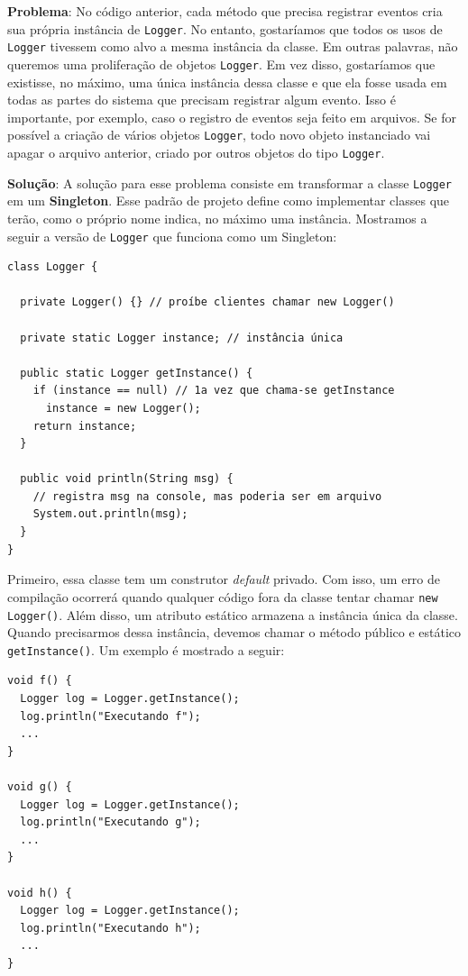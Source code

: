 \documentclass[
  11pt,
  twoside]{book}
\newcommand{\passthrough}[1]{#1}
\begin{document}
\textbf{Problema}: No código anterior, cada método que precisa registrar
eventos cria sua própria instância de \passthrough{\lstinline!Logger!}.
No entanto, gostaríamos que todos os usos de
\passthrough{\lstinline!Logger!} tivessem como alvo a mesma instância da
classe. Em outras palavras, não queremos uma proliferação de objetos
\passthrough{\lstinline!Logger!}. Em vez disso, gostaríamos que
existisse, no máximo, uma única instância dessa classe e que ela fosse
usada em todas as partes do sistema que precisam registrar algum evento.
Isso é importante, por exemplo, caso o registro de eventos seja feito em
arquivos. Se for possível a criação de vários objetos
\passthrough{\lstinline!Logger!}, todo novo objeto instanciado vai
apagar o arquivo anterior, criado por outros objetos do tipo
\passthrough{\lstinline!Logger!}.

\textbf{Solução}: A solução para esse problema consiste em transformar a
classe \passthrough{\lstinline!Logger!} em um \textbf{Singleton}. Esse
padrão de projeto define como implementar classes que terão, como o
próprio nome indica, no máximo uma instância. Mostramos a seguir a
versão de \passthrough{\lstinline!Logger!} que funciona como um
Singleton:

\begin{lstlisting}
class Logger {

  private Logger() {} // proíbe clientes chamar new Logger()

  private static Logger instance; // instância única

  public static Logger getInstance() {
    if (instance == null) // 1a vez que chama-se getInstance
      instance = new Logger();
    return instance;
  }

  public void println(String msg) {
    // registra msg na console, mas poderia ser em arquivo
    System.out.println(msg);      
  }
}
\end{lstlisting}

Primeiro, essa classe tem um construtor \emph{default} privado. Com
isso, um erro de compilação ocorrerá quando qualquer código fora da
classe tentar chamar \passthrough{\lstinline!new Logger()!}. Além disso,
um atributo estático armazena a instância única da classe. Quando
precisarmos dessa instância, devemos chamar o método público e estático
\passthrough{\lstinline!getInstance()!}. Um exemplo é mostrado a seguir:

\begin{lstlisting}
void f() {
  Logger log = Logger.getInstance();  
  log.println("Executando f");
  ...
}

void g() {
  Logger log = Logger.getInstance();  
  log.println("Executando g");
  ...
}

void h() {
  Logger log = Logger.getInstance();  
  log.println("Executando h");
  ...
}
\end{lstlisting}
\end{document}
